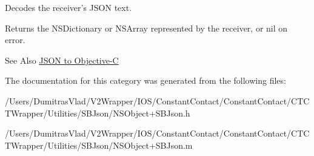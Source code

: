 Decodes the receiver's J\-S\-O\-N text. 

\begin{DoxyReturn}{Returns}
the N\-S\-Dictionary or N\-S\-Array represented by the receiver, or nil on error.
\end{DoxyReturn}
\begin{DoxySeeAlso}{See Also}
\hyperlink{json2objc}{J\-S\-O\-N to Objective-\/\-C} 
\end{DoxySeeAlso}


The documentation for this category was generated from the following files\-:\begin{DoxyCompactItemize}
\item 
/\-Users/\-Dumitras\-Vlad/\-V2\-Wrapper/\-I\-O\-S/\-Constant\-Contact/\-Constant\-Contact/\-C\-T\-C\-T\-Wrapper/\-Utilities/\-S\-B\-Json/N\-S\-Object+\-S\-B\-Json.\-h\item 
/\-Users/\-Dumitras\-Vlad/\-V2\-Wrapper/\-I\-O\-S/\-Constant\-Contact/\-Constant\-Contact/\-C\-T\-C\-T\-Wrapper/\-Utilities/\-S\-B\-Json/N\-S\-Object+\-S\-B\-Json.\-m\end{DoxyCompactItemize}
